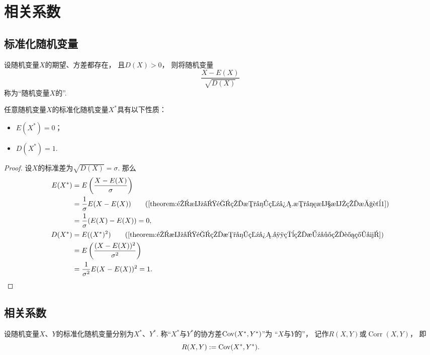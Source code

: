 \section{相关系数}
\subsection{标准化随机变量}
\begin{definition}
设随机变量\(X\)的期望、方差都存在，
且\(D(X) > 0\)，
则将随机变量\begin{equation*}
    \frac{X-E(X)}{\sqrt{D(X)}}
\end{equation*}
称为“随机变量\(X\)的”.
\end{definition}

\begin{property}\label{theorem:随机变量的数字特征.标准化随机变量的数字特征}
任意随机变量\(X\)的标准化随机变量\(X^*\)具有以下性质：\begin{itemize}
    \item \(E(X^*)=0\)；
    \item \(D(X^*)=1\).
\end{itemize}
\begin{proof}
设\(X\)的标准差为\(\sqrt{D(X)}=\sigma\).
那么\begin{align*}
    E(X^*)
	&= E\left(\frac{X-E(X)}{\sigma}\right) \\
	&= \frac1\sigma E(X-E(X))
		\tag{\cref{theorem:随机变量的数字特征.数学期望的性质1}} \\
	&= \frac1\sigma (E(X) - E(X))
	= 0, \\
    D(X^*)
	&= E((X^*)^2)
		\tag{\cref{theorem:随机变量的数字特征.常用的方差的计算式}} \\
	&= E\left(\frac{(X-E(X))^2}{\sigma^2}\right) \\
	&= \frac{1}{\sigma^2} E(X-E(X))^2
	= 1.
    \qedhere
\end{align*}
\end{proof}
\end{property}

\subsection{相关系数}
\begin{definition}\label{definition:随机变量的数字特征.相关系数}
设随机变量\(X\)、\(Y\)的标准化随机变量分别为\(X^*\)、\(Y^*\).
称“\(X^*\)与\(Y^*\)的协方差\(\operatorname{Cov}(X^*,Y^*)\)”为
“\(X\)与\(Y\)的”，
记作\(R(X,Y)\)或\(\operatorname{Corr}(X,Y)\)，
即\begin{equation*}
    R(X,Y) := \operatorname{Cov}(X^*,Y^*).
\end{equation*}
\end{definition}

